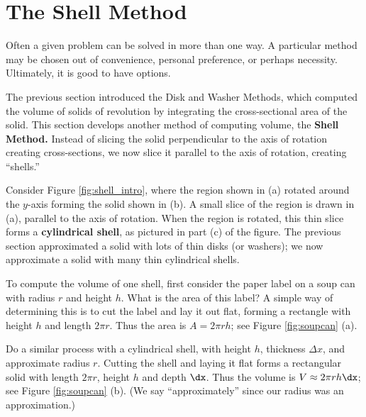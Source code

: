 \section{The Shell Method}\label{sec:shell_method}

Often a given problem can be solved in more than one way. A particular method may be chosen out of convenience, personal preference, or perhaps necessity. Ultimately, it is good to have options.

The previous section introduced the Disk and Washer Methods, which computed the volume of solids of revolution by integrating the cross-sectional area of the solid. This section develops another method of computing volume, the \textbf{Shell Method.} Instead of slicing the solid perpendicular to the axis of rotation creating cross-sections, we now slice it parallel to the axis of rotation, creating ``shells.''

Consider Figure \ref{fig:shell_intro}, where the region shown in (a) rotated around the $y$-axis forming the solid shown in (b). A small slice of the region is drawn in (a), parallel to the axis of rotation. When the region is rotated, this thin slice forms a \textbf{cylindrical shell}, as pictured in part (c) of the figure. The previous section approximated a solid with lots of thin disks (or washers); we now approximate a solid with many thin cylindrical shells. 

To compute the volume of one shell, first consider the paper label on a soup can with radius $r$ and height $h$. What is the area of this label? A simple way of determining this is to cut the label and lay it out flat, forming a rectangle with height $h$ and length $2\pi r$. Thus the area is $A = 2\pi rh$; see Figure \ref{fig:soupcan} (a).

Do a similar process with a cylindrical shell, with height $h$, thickness $\Delta x$, and approximate radius $r$. Cutting the shell and laying it flat forms a rectangular solid with length $2\pi r$, height $h$ and depth $\dx$. Thus the volume is $V \approx 2\pi rh\dx$; see Figure \ref{fig:soupcan} (b). (We say ``approximately'' since our radius was an approximation.)

